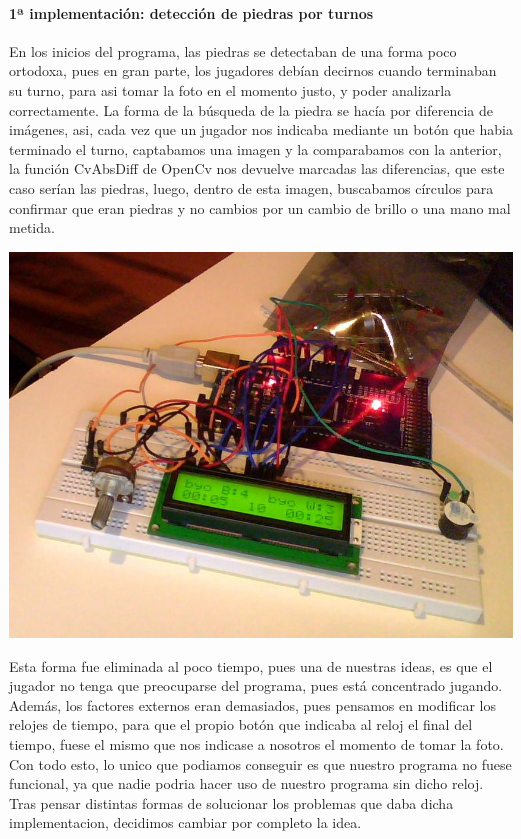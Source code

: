 \documentclass[12pt,a4paper]{report}
\begin{document}
\paragraph{1ª implementación: detección de piedras por turnos}

En los inicios del programa, las piedras se detectaban de una forma poco
ortodoxa, pues en gran parte, los jugadores debían decirnos cuando terminaban su
turno, para asi tomar la foto en el momento justo, y poder analizarla
correctamente. La forma de la búsqueda de la piedra se hacía por diferencia de
imágenes, asi, cada vez que un jugador nos indicaba mediante un botón que habia
terminado el turno, captabamos una imagen y la comparabamos con la anterior, la
función CvAbsDiff de OpenCv nos devuelve marcadas las diferencias, que este caso
serían las piedras, luego, dentro de esta imagen, buscabamos círculos para
confirmar que eran piedras y no cambios por un cambio de brillo o una mano mal
metida.

\includegraphics[scale=0.4]{reloj.jpg}

Esta forma fue eliminada al poco tiempo, pues una de nuestras ideas, es que el
jugador no tenga que preocuparse del programa, pues está concentrado jugando.
Además, los factores externos eran demasiados, pues pensamos en modificar los
relojes de tiempo, para que el propio botón que indicaba al reloj el final del
tiempo, fuese el mismo que nos indicase a nosotros el momento de tomar la foto.
Con todo esto, lo unico que podiamos conseguir es que nuestro programa no fuese
funcional, ya que nadie podria hacer uso de nuestro programa sin dicho reloj.
Tras pensar distintas formas de solucionar los problemas que daba dicha
implementacion, decidimos cambiar por completo la idea.  
\end{document}
